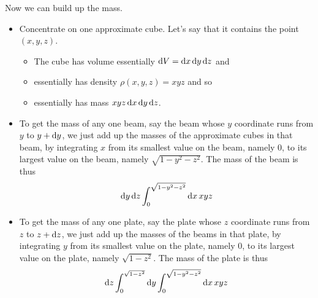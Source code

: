 \begin{eg}
Now we can build up the mass.
\begin{itemize}
\item
Concentrate on one approximate cube. Let's say that it contains the point 
$(x,y,z)$.
\begin{itemize}
\item 
The cube has volume essentially $\mathrm{d}V =  \mathrm{d}x\,\mathrm{d}y\,\mathrm{d}z$
and
\item
essentially has density $\rho(x,y,z) = xyz$ and so
\item 
essentially has mass $xyz\,\mathrm{d}x\,\mathrm{d}y\,\mathrm{d}z$.
\end{itemize}

\item
To get the mass of any one beam, say the beam whose $y$ coordinate runs 
from $y$ to $y+\mathrm{d}y$, we just add up the masses of the approximate 
cubes in that beam, by integrating $x$ from its smallest value on 
the beam, namely $0$, to its largest value on the beam, namely 
$\sqrt{1-y^2-z^2}$. The mass of the beam is thus
\begin{align*}
\mathrm{d}y\,\mathrm{d}z \int_0^{\sqrt{1-y^2-z^2}}  \mathrm{d}x\,xyz
\end{align*}

\item
To get the mass of any one plate, say the plate whose $z$ coordinate runs 
from $z$ to $z+\mathrm{d}z$, we just add up the masses of the beams 
in that plate, by integrating $y$ from its smallest value on 
the plate, namely $0$, to its largest value on the plate, namely 
$\sqrt{1-z^2}$. The mass of the plate is thus
\begin{align*}
\mathrm{d}z\int_0^{\sqrt{1-z^2}}\mathrm{d}y\int_0^{\sqrt{1-y^2-z^2}}  \mathrm{d}x\,xyz
\end{align*}


\end{itemize}
\end{eg}
